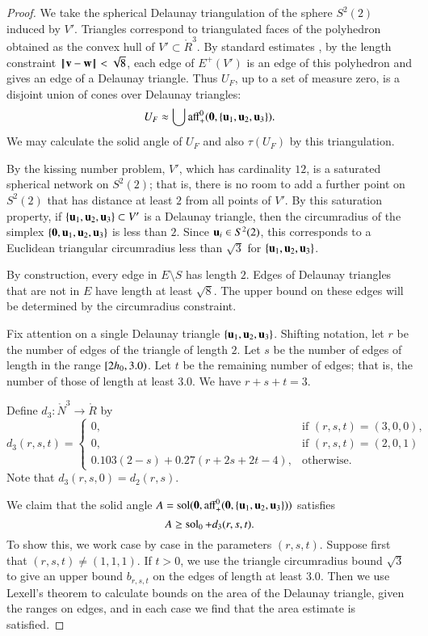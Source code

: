 \documentclass{llncs}
\def\op#1{{\hbox{#1}}}
\begin{document}
\begin{proof}  
  We take the spherical Delaunay triangulation of the sphere $S^2(2)$ induced by $V'$.  
Triangles correspond to triangulated faces of the polyhedron obtained as 
the convex hull of $V'\subset\ring{R}^3$.  By standard estimates 
\cite{DSP}, by the length constraint $\norm{\v}{\w}<\sqrt8$, 
each edge of $E^+(V')$ is an edge of this polyhedron and 
gives an edge of a Delaunay triangle.  Thus $U_F$, up to a set of measure zero, 
is a disjoint union of cones over Delaunay triangles:
\[
U_F \approx \bigcup \op{aff}_+^0(\orz,\{\u_1,\u_2,\u_3\}).
\]
We may calculate the solid angle of $U_F$ and also $\tau(U_F)$ by this triangulation.

By the kissing number problem, $V'$, which has cardinality $12$, is a saturated spherical network on $S^2(2)$;
that is, there is no room to add a further point on $S^2(2)$ that has distance at least $2$ from all points
of $V'$.  By this saturation property, if $\{{\mathbf u}_1,{\mathbf u}_2,{\mathbf u}_3\}\subset V'$ is a Delaunay triangle, then
the circumradius of the simplex $\{{\mathbf 0},{\mathbf u}_1,{\mathbf u}_2,{\mathbf u}_3\}$ is less than $2$.  Since ${\mathbf u}_i\in S^2(2)$, this
corresponds to a Euclidean triangular circumradius less than $\sqrt3$ for $\{{\mathbf u}_1,{\mathbf u}_2,{\mathbf u}_3\}$.

By construction,  every edge in $E\setminus S$ has length $2$.
Edges of Delaunay triangles that are not in $E$ have length at least $\sqrt8$.  The upper bound
on these edges will be determined by the circumradius constraint.

Fix attention on a single Delaunay triangle $\{{\mathbf u}_1,{\mathbf u}_2,{\mathbf u}_3\}$. Shifting notation,
let $r$ be the number of edges of the triangle of length $2$.  Let $s$ be the number of edges
of length in the range $[ 2h_0,3.0)$.  Let $t$ be the remaining number of edges; 
that is, the number of those of length at least $3.0$.  We have $r+s+t=3$.

Define $d_3:\ring{N}^3\to\ring{R}$ by
\[
d_3(r,s,t) = 
\begin{cases}
0, & \text{if } (r,s,t)=(3,0,0),\\
0, &\text{if } (r,s,t)=(2,0,1)\\
0.103 (2 - s) + 0.27 (r+2 s+2 t-4),&\text{otherwise. }
\end{cases}
\]
Note that $d_3(r,s,0)=d_2(r,s)$.

We claim that the solid angle $A=\op{sol}(\orz,\op{aff}_+^0(\orz,\{\u_1,\u_2,\u_3\}))$ satisfies
\begin{equation}\label{eqn:d3}
A\ge \operatorname{sol}_0 + d_3(r,s,t).
\end{equation}
To show this, we work case by case in the parameters $(r,s,t)$.
Suppose first that $(r,s,t)\ne (1,1,1)$.
If $t>0$, we use the triangle circumradius bound $\sqrt3$ 
to give an upper bound $b_{r,s,t}$ on the edges of length at least $3.0$.
Then we use Lexell's theorem to calculate bounds on the area of the Delaunay triangle,
given the ranges on edges, and in each case we find that the area estimate is satisfied.


\end{proof}
\end{document}
